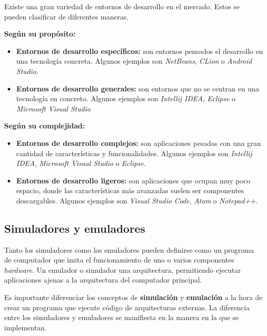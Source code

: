 Existe una gran variedad de entornos de desarrollo en el mercado.
Estos se pueden clasificar de diferentes maneras.

\textbf{Según su propósito:}
\begin{itemize}
    \item \textbf{Entornos de desarrollo específicos:} son entornos pensados  el desarrollo en una
    tecnología concreta.
    Algunos ejemplos son \textit{NetBeans}, \textit{CLion} o \textit{Android Studio}.
    \item \textbf{Entornos de desarrollo generales:} son entornos que no se centran en una tecnología en concreto.
    Algunos ejemplos son \textit{Intellij IDEA}\cite{INTELLIJIDEA},
    \textit{Eclipse}\cite{ECLIPSE} o \textit{Microsoft Visual Studio}\cite{VISUALSTUDIO}
\end{itemize}

\textbf{Según su complejidad:}
\begin{itemize}
    \item \textbf{Entornos de desarrollo complejos:} son aplicaciones pesadas con una gran cantidad de
    características y funcionalidades.
    Algunos ejemplos son \textit{Intellij IDEA},
    \textit{Microsoft Visual Studio} o \textit{Eclipse}.
    \item \textbf{Entornos de desarrollo ligeros:} son aplicaciones que ocupan muy poco espacio, donde
    las características más avanzadas suelen ser componentes descargables.
    Algunos ejemplos son \textit{Visual Studio Code}\cite{VISUALSTUDIOCODE},
    \textit{Atom}\cite{ATOM} o \textit{Notepad++}\cite{NOTEPADPP}.
\end{itemize}

\subsection{Simuladores y emuladores}
\label{subsec:simuladores-y-emuladores}

Tanto los simuladores como los emuladores pueden definirse como un
programa de computador que imita el funcionamiento de uno o varios
componentes \textit{hardware}.
Un emulador o simulador  una arquitectura, permitiendo
ejecutar aplicaciones ajenas a la arquitectura del computador principal.

Es importante diferenciar los conceptos de \textbf{simulación}
y \textbf{emulación} a la hora de crear un programa que ejecute
código de arquitecturas externas.
La diferencia entre los simuladores y emuladores se manifiesta
en la manera en la que se implementan.

